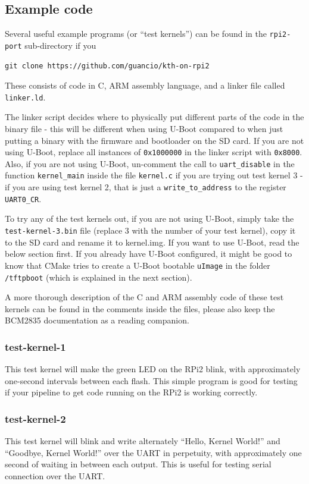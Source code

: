 \documentclass[a4paper,11pt,reqno]{amsart}
\begin{document}
{\subsection{Example code}
Several useful example programs (or ``test kernels'') can be found in the \texttt{rpi2-port} sub-directory if you

\begin{verbatim}
git clone https://github.com/guancio/kth-on-rpi2
\end{verbatim}

These consists of code in C, ARM assembly language, and a linker file called \texttt{linker.ld}.

The linker script decides where to physically put different parts of the code in the binary file - this will be different when using U-Boot compared to when just putting a binary with the firmware and bootloader on the SD card. If you are not using U-Boot, replace all instances of  \texttt{0x1000000} in the linker script with \texttt{0x8000}. Also, if you are not using U-Boot, un-comment the call to \texttt{uart\_disable} in the function \texttt{kernel\_main} inside the file \texttt{kernel.c} if you are trying out test kernel 3 - if you are using test kernel 2, that is just a \texttt{write\_to\_address} to the register \texttt{UART0\_CR}.

To try any of the test kernels out, if you are not using U-Boot, simply take the \texttt{test-kernel-3.bin} file (replace 3 with the number of your test kernel), copy it to the SD card and rename it to kernel.img. If you want to use U-Boot, read the below section first. If you already have U-Boot configured, it might be good to know that CMake tries to create a U-Boot bootable \texttt{uImage} in the folder \texttt{/tftpboot} (which is explained in the next section).

A more thorough description of the C and ARM assembly code of these test kernels can be found in the comments inside the files, please also keep the BCM2835 documentation as a reading companion.

\subsubsection{test-kernel-1}
This test kernel will make the green LED on the RPi2 blink, with approximately one-second intervals between each flash. This simple program is good for testing if your pipeline to get code running on the RPi2 is working correctly.

\subsubsection{test-kernel-2}
This test kernel will blink and write alternately ``Hello, Kernel World!'' and ``Goodbye, Kernel World!'' over the UART in perpetuity, with approximately one second of waiting in between each output. This is useful for testing serial connection over the UART.

}
\end{document}
